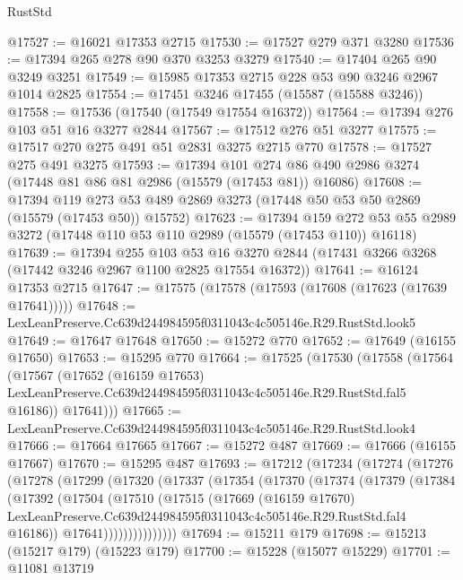 \begin{lexlean}{RustStd}
\begin{coremodule}
@17527 := @16021 @17353 @2715
@17530 := @17527 @279 @371 @3280
@17536 := @17394 @265 @278 @90 @370 @3253 @3279
@17540 := @17404 @265 @90 @3249 @3251
@17549 := @15985 @17353 @2715 @228 @53 @90 @3246 @2967 @1014 @2825
@17554 := @17451 @3246 @17455 (@15587 (@15588 @3246))
@17558 := @17536 (@17540 (@17549 @17554 @16372))
@17564 := @17394 @276 @103 @51 @16 @3277 @2844
@17567 := @17512 @276 @51 @3277
@17575 := @17517 @270 @275 @491 @51 @2831 @3275 @2715 @770
@17578 := @17527 @275 @491 @3275
@17593 := @17394
    @101
    @274
    @86
    @490
    @2986
    @3274
    (@17448 @81 @86 @81 @2986 (@15579 (@17453 @81)) @16086)
@17608 := @17394
    @119
    @273
    @53
    @489
    @2869
    @3273
    (@17448 @50 @53 @50 @2869 (@15579 (@17453 @50)) @15752)
@17623 := @17394
    @159
    @272
    @53
    @55
    @2989
    @3272
    (@17448 @110 @53 @110 @2989 (@15579 (@17453 @110)) @16118)
@17639 := @17394
    @255
    @103
    @53
    @16
    @3270
    @2844
    (@17431 @3266 @3268 (@17442 @3246 @2967 @1100 @2825 @17554 @16372))
@17641 := @16124 @17353 @2715
@17647 := @17575 (@17578 (@17593 (@17608 (@17623 (@17639 @17641)))))
@17648 := LexLeanPreserve.Cc639d244984595f0311043c4c505146e.R29.RustStd.look5
@17649 := @17647 @17648
@17650 := @15272 @770
@17652 := @17649 (@16155 @17650)
@17653 := @15295 @770
@17664 := @17525
    (@17530
      (@17558
        (@17564
          (@17567
            (@17652
              (@16159 @17653)
              LexLeanPreserve.Cc639d244984595f0311043c4c505146e.R29.RustStd.fal5
              @16186))
          @17641)))
@17665 := LexLeanPreserve.Cc639d244984595f0311043c4c505146e.R29.RustStd.look4
@17666 := @17664 @17665
@17667 := @15272 @487
@17669 := @17666 (@16155 @17667)
@17670 := @15295 @487
@17693 := @17212
    (@17234
      (@17274
        (@17276
          (@17278
            (@17299
              (@17320
                (@17337
                  (@17354
                    (@17370
                      (@17374
                        (@17379
                          (@17384
                            (@17392
                              (@17504
                                (@17510
                                  (@17515
                                    (@17669
                                      (@16159 @17670)
                                      LexLeanPreserve.Cc639d244984595f0311043c4c505146e.R29.RustStd.fal4
                                      @16186))
                                  @17641)))))))))))))))
@17694 := @15211 @179
@17698 := @15213 (@15217 @179) (@15223 @179)
@17700 := @15228 (@15077 @15229)
@17701 := @11081 @13719

\end{coremodule}
\end{lexlean}
